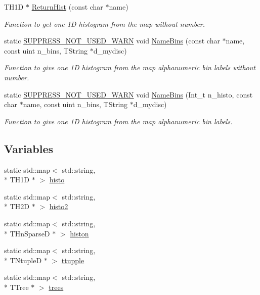\begin{DoxyCompactItemize}
T\-H1\-D $\ast$ \hyperlink{namespaceHistClass_adfd24a84c12f9e51ec06bbeba6b83c39}{Return\-Hist} (const char $\ast$name)
\begin{DoxyCompactList}\small\item\em Function to get one 1\-D histogram from the map without number. \end{DoxyCompactList}\item 
static \hyperlink{HistClass_8hh_a85edd6ac47f5ea2970c76af20855738c}{S\-U\-P\-P\-R\-E\-S\-S\-\_\-\-N\-O\-T\-\_\-\-U\-S\-E\-D\-\_\-\-W\-A\-R\-N} void \hyperlink{namespaceHistClass_acb93f9b104c1f0f129109190caaf447b}{Name\-Bins} (const char $\ast$name, const uint n\-\_\-bins, T\-String $\ast$d\-\_\-mydisc)
\begin{DoxyCompactList}\small\item\em Function to give one 1\-D histogram from the map alphanumeric bin labels without number. \end{DoxyCompactList}\item 
static \hyperlink{HistClass_8hh_a85edd6ac47f5ea2970c76af20855738c}{S\-U\-P\-P\-R\-E\-S\-S\-\_\-\-N\-O\-T\-\_\-\-U\-S\-E\-D\-\_\-\-W\-A\-R\-N} void \hyperlink{namespaceHistClass_a618a4e823e746a518833b35d2992619a}{Name\-Bins} (Int\-\_\-t n\-\_\-histo, const char $\ast$name, const uint n\-\_\-bins, T\-String $\ast$d\-\_\-mydisc)
\begin{DoxyCompactList}\small\item\em Function to give one 1\-D histogram from the map alphanumeric bin labels. \end{DoxyCompactList}\end{DoxyCompactItemize}
\subsection*{Variables}
\begin{DoxyCompactItemize}
\item 
static std\-::map$<$ std\-::string, \\*
T\-H1\-D $\ast$ $>$ \hyperlink{namespaceHistClass_aecbf6b504ef1fe080432da67ce20aa61}{histo}
\item 
static std\-::map$<$ std\-::string, \\*
T\-H2\-D $\ast$ $>$ \hyperlink{namespaceHistClass_afe55352b20fad49b9f1127977f69f0be}{histo2}
\item 
static std\-::map$<$ std\-::string, \\*
T\-Hn\-Sparse\-D $\ast$ $>$ \hyperlink{namespaceHistClass_a32bc8c292c5e253ad53774e1e667d9e4}{histon}
\item 
static std\-::map$<$ std\-::string, \\*
T\-Ntuple\-D $\ast$ $>$ \hyperlink{namespaceHistClass_ad55b28aa4052eaf0b5e9bbeba8575f02}{ttupple}
\item 
static std\-::map$<$ std\-::string, \\*
T\-Tree $\ast$ $>$ \hyperlink{namespaceHistClass_ae4231d725185c3df09776135acb36fce}{trees}
\end{DoxyCompactItemize}


